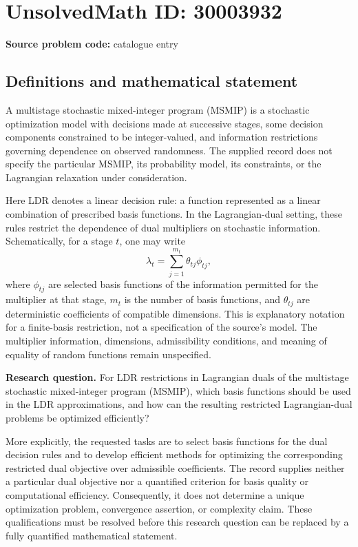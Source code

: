 \documentclass[11pt]{article}
\begin{document}
\section*{UnsolvedMath ID: 30003932}
\textbf{Source problem code:} catalogue entry
\subsection{Definitions and mathematical statement}
A multistage stochastic mixed-integer program (MSMIP) is a stochastic optimization model with decisions made at successive stages, some decision components constrained to be integer-valued, and information restrictions governing dependence on observed randomness. The supplied record does not specify the particular MSMIP, its probability model, its constraints, or the Lagrangian relaxation under consideration.

Here LDR denotes a linear decision rule: a function represented as a linear combination of prescribed basis functions. In the Lagrangian-dual setting, these rules restrict the dependence of dual multipliers on stochastic information. Schematically, for a stage \(t\), one may write
\[
\lambda_t=\sum_{j=1}^{m_t}\theta_{tj}\phi_{tj},
\]
where \(\phi_{tj}\) are selected basis functions of the information permitted for the multiplier at that stage, \(m_t\) is the number of basis functions, and \(\theta_{tj}\) are deterministic coefficients of compatible dimensions. This is explanatory notation for a finite-basis restriction, not a specification of the source's model. The multiplier information, dimensions, admissibility conditions, and meaning of equality of random functions remain unspecified.

\textbf{Research question.} For LDR restrictions in Lagrangian duals of the multistage stochastic mixed-integer program (MSMIP), which basis functions should be used in the LDR approximations, and how can the resulting restricted Lagrangian-dual problems be optimized efficiently?

More explicitly, the requested tasks are to select basis functions for the dual decision rules and to develop efficient methods for optimizing the corresponding restricted dual objective over admissible coefficients. The record supplies neither a particular dual objective nor a quantified criterion for basis quality or computational efficiency. Consequently, it does not determine a unique optimization problem, convergence assertion, or complexity claim. These qualifications must be resolved before this research question can be replaced by a fully quantified mathematical statement.
\end{document}
